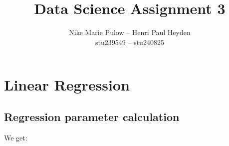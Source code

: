 

\usepackage{pgfplots}
\pgfplotsset{compat=1.18}

\newcommand{\nr}{3}
\title{Data Science Assignment \nr}
\author{Nike Marie Pulow -- Henri Paul Heyden \\ \small stu239549 -- stu240825}
\date{}


    \maketitle
    \section{Linear Regression}
        \subsection{Regression parameter calculation}
        We get:
